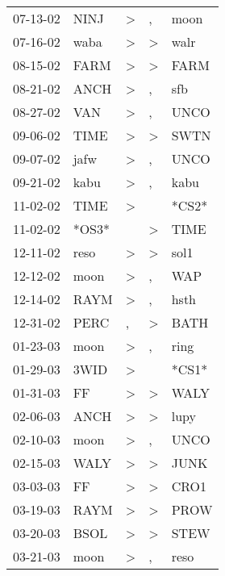 \begin{supertabular}{lllll}
 07-13-02 &   NINJ &     \textgreater &                , &   moon \\
 07-16-02 &   waba &     \textgreater &     \textgreater &   walr \\
 08-15-02 &   FARM &     \textgreater &     \textgreater &   FARM \\
 08-21-02 &   ANCH &     \textgreater &                , &    sfb \\
 08-27-02 &    VAN &     \textgreater &                , &   UNCO \\
 09-06-02 &   TIME &     \textgreater &     \textgreater &   SWTN \\
 09-07-02 &   jafw &     \textgreater &                , &   UNCO \\
 09-21-02 &   kabu &     \textgreater &                , &   kabu \\
 11-02-02 &   TIME &     \textgreater &                  &  *CS2* \\
 11-02-02 &  *OS3* &                  &     \textgreater &   TIME \\
 12-11-02 &   reso &     \textgreater &     \textgreater &   sol1 \\
 12-12-02 &   moon &     \textgreater &                , &    WAP \\
 12-14-02 &   RAYM &     \textgreater &                , &   hsth \\
 12-31-02 &   PERC &                , &     \textgreater &   BATH \\
 01-23-03 &   moon &     \textgreater &                , &   ring \\
 01-29-03 &   3WID &     \textgreater &                  &  *CS1* \\
 01-31-03 &     FF &     \textgreater &     \textgreater &   WALY \\
 02-06-03 &   ANCH &     \textgreater &     \textgreater &   lupy \\
 02-10-03 &   moon &     \textgreater &                , &   UNCO \\
 02-15-03 &   WALY &     \textgreater &     \textgreater &   JUNK \\
 03-03-03 &     FF &     \textgreater &     \textgreater &   CRO1 \\
 03-19-03 &   RAYM &     \textgreater &     \textgreater &   PROW \\
 03-20-03 &   BSOL &     \textgreater &     \textgreater &   STEW \\
 03-21-03 &   moon &     \textgreater &                , &   reso \\

\end{supertabular}

